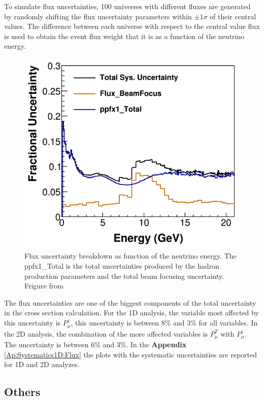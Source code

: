 To simulate flux uncertainties, 100 universes with different fluxes are generated by randomly shifting the flux uncertainty parameters within $\pm1\sigma$ of their central values. The difference between each universe with respect to the central value flux is used to obtain the event flux weight that it is as a function of the neutrino energy. 

\begin{figure}[!htb]
    \centering
    \includegraphics[scale=0.4]{Figures/Chapter6/BeamUncertainties.png}
    \caption{Flux uncertainty breakdown as function of the neutrino energy. The ppfx1\_Total is the total uncertainties produced by the hadron production parameters and the total beam focusing uncertainty. Frigure from \cite{BenThesis}}
    \label{fig:Systematics:FluxUncertainties}
\end{figure} 

The flux uncertainties are one of the biggest components of the total uncertainty in the cross section calculation. For the 1D analysis, the variable most affected by this uncertainty is $P^z_\mu$, this uncertainty is between 8\% and 3\% for all variables. In the 2D analysis, the combination of the more affected variables is $P^T_\mu$ with $P^z_\mu$. The uncertainty is between 6\% and 3\%. In the \textbf{Appendix} \ref{Ap:Systematics1D:Flux} the plots with the systematic uncertainties are reported for 1D and 2D analyzes. 

\subsection{Others}
\label{Cap:ErrorAnalysis:SystematicUnc:Others}

